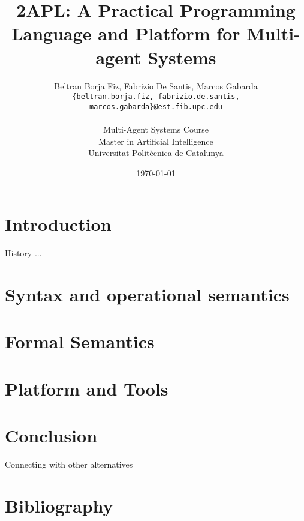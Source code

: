 \documentclass[a4paper]{article}
\begin{document}
\title{2APL: A Practical Programming Language and Platform for Multi-agent Systems}
 
\author{Beltran Borja Fiz, Fabrizio De Santis, Marcos Gabarda\\
\small \texttt{\{beltran.borja.fiz, fabrizio.de.santis, marcos.gabarda\}@est.fib.upc.edu}\\
\\
Multi-Agent Systems Course\\
Master in Artificial Intelligence\\
Universitat Polit\`ecnica de Catalunya}
\date{\today}

\maketitle

\tableofcontents

\section{Introduction}

History ...

\section{Syntax and operational semantics}

\section{Formal Semantics}

\section{Platform and Tools}

\section{Conclusion}

Connecting with other alternatives

\section{Bibliography}
\nocite{*}


\end{document}
